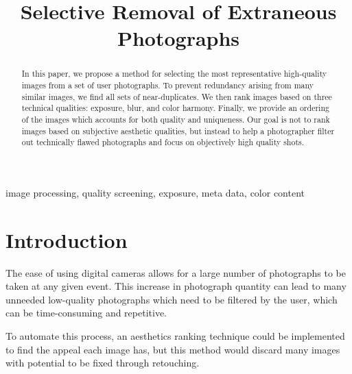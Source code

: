 \documentclass{article}
\begin{document}
\sloppy
\topmargin=0mm			


\title{
Selective Removal of Extraneous Photographs
}

\address{[ksamii,acarlisl]@ucsc.edu,[uliana,davis]@soe.ucsc.edu}

\maketitle	
\begin{abstract}
In this paper, we propose a method for selecting the most representative high-quality images from a set of user photographs. To prevent redundancy arising from many similar images, we find all sets of near-duplicates. We then rank images based on three technical qualities: exposure, blur, and color harmony. Finally, we provide an ordering of the images which accounts for both quality and uniqueness. Our goal is not to rank images based on subjective aesthetic qualities, but instead to help a photographer filter out technically flawed photographs and focus on objectively high quality shots.
\end{abstract}	

\begin{keywords}
image processing, quality screening, exposure, meta data, color content  %
\end{keywords}

\section{Introduction}
\label{sec:intro}

The ease of using digital cameras allows for a large number of photographs to be taken at any given event. This increase in photograph quantity can lead to many unneeded low-quality photographs which need to be filtered by the user, which can be time-consuming and repetitive.

To automate this process, an aesthetics ranking technique could be implemented to find the appeal each image has, but this method would discard many images with potential to be fixed through retouching.
\end{document}
